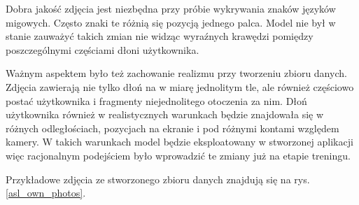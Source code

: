 \documentclass[a4paper,12pt,oneside]{book} %
\begin{document}
Dobra jakość zdjęcia jest niezbędna przy próbie wykrywania znaków języków migowych. Często znaki te różnią się pozycją jednego palca. Model nie był w stanie zauważyć takich zmian nie widząc wyraźnych krawędzi pomiędzy poszczególnymi częściami dłoni użytkownika.

Ważnym aspektem było też zachowanie realizmu przy tworzeniu zbioru danych. Zdjęcia zawierają nie tylko dłoń na w miarę jednolitym tle, ale również częściowo postać użytkownika i fragmenty niejednolitego otoczenia za nim. Dłoń użytkownika również w realistycznych warunkach będzie znajdowała się w różnych odległościach, pozycjach na ekranie i pod różnymi kontami względem kamery. W takich warunkach model będzie eksploatowany w stworzonej aplikacji więc racjonalnym podejściem było wprowadzić te zmiany już na etapie treningu. 

Przykładowe zdjęcia ze stworzonego zbioru danych znajdują się na rys. \ref{asl_own_photos}.
\end{document}
